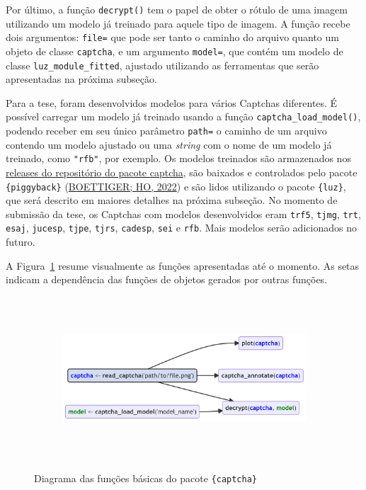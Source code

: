 \documentclass[12pt,twoside,brazilian]{book}
\begin{document}
Por último, a função \texttt{decrypt()} tem o papel de obter o rótulo de
uma imagem utilizando um modelo já treinado para aquele tipo de imagem.
A função recebe dois argumentos: \texttt{file=} que pode ser tanto o
caminho do arquivo quanto um objeto de classe \texttt{captcha}, e um
argumento \texttt{model=}, que contém um modelo de classe
\texttt{luz\_module\_fitted}, ajustado utilizando as ferramentas que
serão apresentadas na próxima subseção.

Para a tese, foram desenvolvidos modelos para vários Captchas
diferentes. É possível carregar um modelo já treinado usando a função
\texttt{captcha\_load\_model()}, podendo receber em seu único parâmetro
\texttt{path=} o caminho de um arquivo contendo um modelo ajustado ou
uma \emph{string} com o nome de um modelo já treinado, como
\texttt{"rfb"}, por exemplo. Os modelos treinados são armazenados nos
\href{https://github.com/decryptr/captcha/releases}{releases do
repositório do pacote captcha}, são baixados e controlados pelo pacote
\texttt{\{piggyback\}} (\protect\hyperlink{ref-piggyback}{BOETTIGER; HO,
2022}) e são lidos utilizando o pacote \texttt{\{luz\}}, que será
descrito em maiores detalhes na próxima subseção. No momento de
submissão da tese, os Captchas com modelos desenvolvidos eram
\texttt{trf5}, \texttt{tjmg}, \texttt{trt}, \texttt{esaj},
\texttt{jucesp}, \texttt{tjpe}, \texttt{tjrs}, \texttt{cadesp},
\texttt{sei} e \texttt{rfb}. Mais modelos serão adicionados no futuro.

A Figura~\ref{fig-diagrama-captcha-simples} resume visualmente as
funções apresentadas até o momento. As setas indicam a dependência das
funções de objetos gerados por outras funções.

\begin{figure}

{\centering 

\begin{figure}[H]

{\centering \includegraphics[width=6.61in,height=2.38in]{./resultados_files/figure-latex/mermaid-figure-1.png}

}

\end{figure}

}

\caption{\label{fig-diagrama-captcha-simples}Diagrama das funções
básicas do pacote \texttt{\{captcha\}}}

\end{figure}
\end{document}
